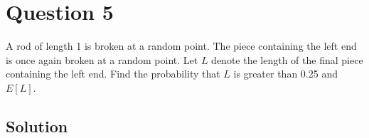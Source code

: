 \section*{Question 5}

A rod of length 1 is broken at a random point.
The piece containing the left end is once again broken at a random point.
Let \( L \) denote the length of the final piece containing the left end.
Find the probability that \( L \) is greater than 0.25 and \( E[L] \).

\subsection*{Solution}
